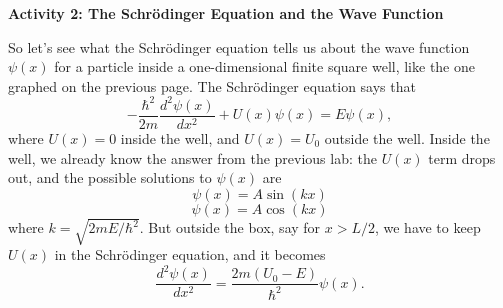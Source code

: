 \bigskip

\textbf{Activity 2: The Schr\"odinger Equation and the Wave Function}

So let's see what the Schr\"odinger equation tells us about the wave function $\psi(x)$ for a particle inside a one-dimensional finite square well, like the one graphed on the previous page. The Schr\"odinger equation says that
$$-\frac{\hbar^2}{2m} \frac{d^2\psi(x)}{dx^2} + U(x)\psi(x) = E\psi(x),$$
where $U(x) = 0$ inside the well, and $U(x) = U_0$ outside the well. Inside the well, we already know
the answer from the previous lab: the $U(x)$ term drops out, and the possible solutions to $\psi(x)$ are
$$\psi(x)=A\sin(kx)$$
$$\psi(x)=A\cos(kx)$$
where $k=\sqrt{2mE/\hbar^2}$.
But outside the box, say for $x > L/2$, we have to keep $U(x)$ in the Schr\"odinger equation, and it becomes
$$\frac{d^2\psi(x)}{dx^2} = \frac{2m(U_0 - E)}{\hbar^2}\psi(x).$$

